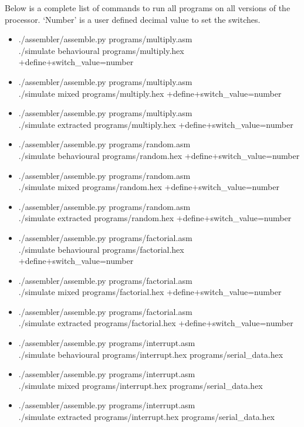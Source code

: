 Below is a complete list of commands to run all programs on all versions of the processor.
`Number' is a user defined decimal value to set the switches.
\begin{itemize}
\item ./assembler/assemble.py programs/multiply.asm \\ ./simulate behavioural programs/multiply.hex +define+switch\_value=number
\item ./assembler/assemble.py programs/multiply.asm \\ ./simulate mixed programs/multiply.hex +define+switch\_value=number
\item ./assembler/assemble.py programs/multiply.asm \\ ./simulate extracted programs/multiply.hex +define+switch\_value=number\\

\item ./assembler/assemble.py programs/random.asm \\ ./simulate behavioural programs/random.hex +define+switch\_value=number
\item ./assembler/assemble.py programs/random.asm \\ ./simulate mixed programs/random.hex +define+switch\_value=number
\item ./assembler/assemble.py programs/random.asm \\ ./simulate extracted programs/random.hex +define+switch\_value=number\\

\item ./assembler/assemble.py programs/factorial.asm \\ ./simulate behavioural programs/factorial.hex +define+switch\_value=number
\item ./assembler/assemble.py programs/factorial.asm \\ ./simulate mixed programs/factorial.hex +define+switch\_value=number
\item ./assembler/assemble.py programs/factorial.asm \\ ./simulate extracted programs/factorial.hex +define+switch\_value=number\\

\item ./assembler/assemble.py programs/interrupt.asm \\ ./simulate behavioural programs/interrupt.hex programs/serial\_data.hex
\item ./assembler/assemble.py programs/interrupt.asm \\ ./simulate mixed programs/interrupt.hex programs/serial\_data.hex
\item ./assembler/assemble.py programs/interrupt.asm \\ ./simulate extracted programs/interrupt.hex programs/serial\_data.hex
\end{itemize}

